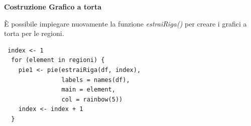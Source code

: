 \noindent \textbf{Costruzione Grafico a torta}

È possibile impiegare nuovamente la funzione \textit{estraiRiga()} per creare i grafici a torta per le regioni.

\vspace{5mm}
\begin{lstlisting}
 index <- 1
  for (element in regioni) {
    pie1 <- pie(estraiRiga(df, index),
                labels = names(df),
                main = element,
                col = rainbow(5))
    index <- index + 1
  }
\end{lstlisting}
\vspace{5mm}

\begin{figure}[!htbp]
    \centering
        \qquad
        \qquad
\end{figure}

